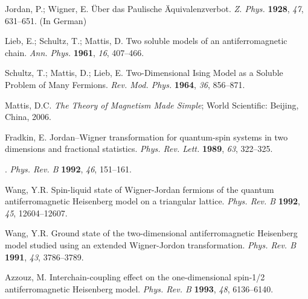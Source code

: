 \documentclass[twocolumn,floats,superscriptaddress]{revtex4}
\begin{document}
\begin{thebibliography}{999}
Jordan, P.; Wigner, E. \"{U}ber das Paulische \"{A}quivalenzverbot. \emph{Z. Phys.} {\bf 1928}, {\it 47}, 631--651. {(In German)} %

Lieb, E.; Schultz, T.; Mattis, D. Two soluble models of an antiferromagnetic chain. \emph{Ann. Phys.} {\bf 1961}, {\it 16}, 407--466.

Schultz, T.; Mattis, D.; Lieb, E. Two-Dimensional Ising Model as a Soluble Problem of Many Fermions. \emph{Rev. Mod. Phys.} {\bf 1964}, {\it 36}, 856--871.

Mattis, D.C. \emph{The Theory of Magnetism Made Simple}; World Scientific: Beijing, China, 2006.

Fradkin, E. Jordan--Wigner transformation for quantum-spin systems in two dimensions and fractional statistics. \emph{Phys. Rev. Lett.} {\bf 1989}, {\it 63}, 322--325.

. \emph{Phys. Rev. B} {\bf 1992}, {\it 46}, 151--161.

 Wang, Y.R. Spin-liquid state of Wigner-Jordan fermions of the quantum antiferromagnetic Heisenberg model on a triangular lattice. \emph{Phys. Rev. B} {\bf 1992}, {\it 45}, 12604--12607.

 Wang, Y.R. Ground state of the two-dimensional antiferromagnetic Heisenberg model studied using an extended Wigner-Jordon transformation. \emph{Phys. Rev. B} {\bf 1991}, {\it 43}, 3786--3789.

Azzouz, M. Interchain-coupling effect on the one-dimensional spin-1/2 antiferromagnetic Heisenberg model. \emph{Phys. Rev. B} {\bf 1993}, {\it 48}, 6136--6140.


\end{thebibliography}
\end{document}
